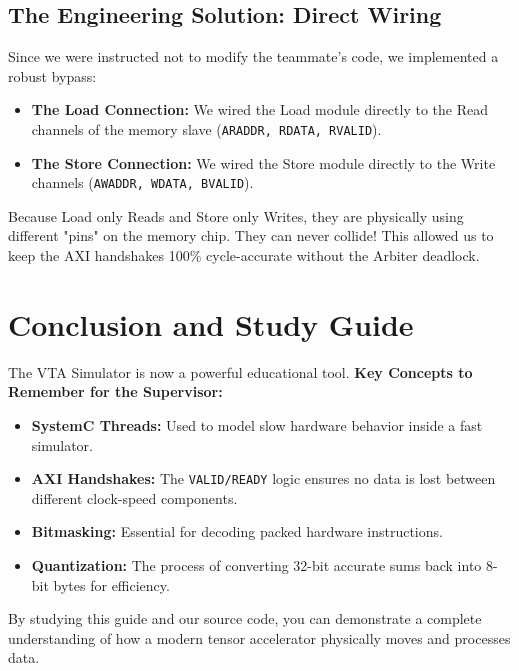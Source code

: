 \documentclass[11pt,a4paper]{report}
\begin{document}
\section{The Engineering Solution: Direct Wiring}
Since we were instructed not to modify the teammate's code, we implemented a robust bypass:
\begin{itemize}
    \item \textbf{The Load Connection:} We wired the Load module directly to the Read channels of the memory slave (\texttt{ARADDR, RDATA, RVALID}).
    \item \textbf{The Store Connection:} We wired the Store module directly to the Write channels (\texttt{AWADDR, WDATA, BVALID}).
\end{itemize}
Because Load only Reads and Store only Writes, they are physically using different "pins" on the memory chip. They can never collide! This allowed us to keep the AXI handshakes 100\% cycle-accurate without the Arbiter deadlock.

\chapter{Conclusion and Study Guide}
The VTA Simulator is now a powerful educational tool. 
\textbf{Key Concepts to Remember for the Supervisor:}
\begin{itemize}
    \item \textbf{SystemC Threads:} Used to model slow hardware behavior inside a fast simulator.
    \item \textbf{AXI Handshakes:} The \texttt{VALID/READY} logic ensures no data is lost between different clock-speed components.
    \item \textbf{Bitmasking:} Essential for decoding packed hardware instructions.
    \item \textbf{Quantization:} The process of converting 32-bit accurate sums back into 8-bit bytes for efficiency.
\end{itemize}

By studying this guide and our source code, you can demonstrate a complete understanding of how a modern tensor accelerator physically moves and processes data.
\end{document}
